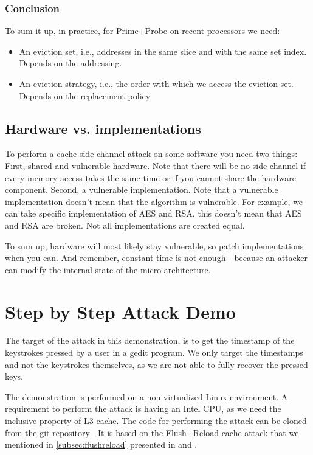 \subsubsection{Conclusion}
\label{subsubsec:Conclusion}
To sum it up, in practice, for Prime+Probe on recent processors we need:
\begin{itemize}
    \item An eviction set, i.e., addresses in the same slice and with the same set index. Depends on the addressing.
    \item An eviction strategy, i.e., the order with which we access the eviction set. Depends on the replacement policy
\end{itemize}

\subsection{Hardware vs. implementations}
\label{subsec:Hardwarevsimplementations}

To perform a cache side-channel attack on some software you need two things: First, shared and vulnerable hardware. Note that there will be no side channel if every memory access takes the same time or if you cannot share the hardware component. Second, a vulnerable implementation. Note that a vulnerable implementation doesn't mean that the algorithm is vulnerable. For example, we can take specific implementation of AES and RSA, this doesn't mean that AES and RSA are broken. Not all implementations are created equal.

To sum up, hardware will most likely stay vulnerable, so patch implementations when you can. And remember, constant time is not enough - because an attacker can modify the internal state of the micro-architecture.

\section{Step by Step Attack Demo} %
\label{sec:stepbystepattack}

The target of the attack in this demonstration, is to get the timestamp of the keystrokes pressed by a user in a gedit program. We only target the timestamps and not the keystrokes themselves, as we are not able to fully recover the pressed keys.

The demonstration is performed on a non-virtualized Linux environment. A requirement to perform the attack is having an Intel CPU, as we need the inclusive property of L3 cache. The code for performing the attack can be cloned from the git repository \cite{GitClementine}. It is based on the Flush+Reload cache attack that we mentioned in \cref{subsec:flushreload} presented in \cite{Yarom2014} and \cite{Gruss2015}.

